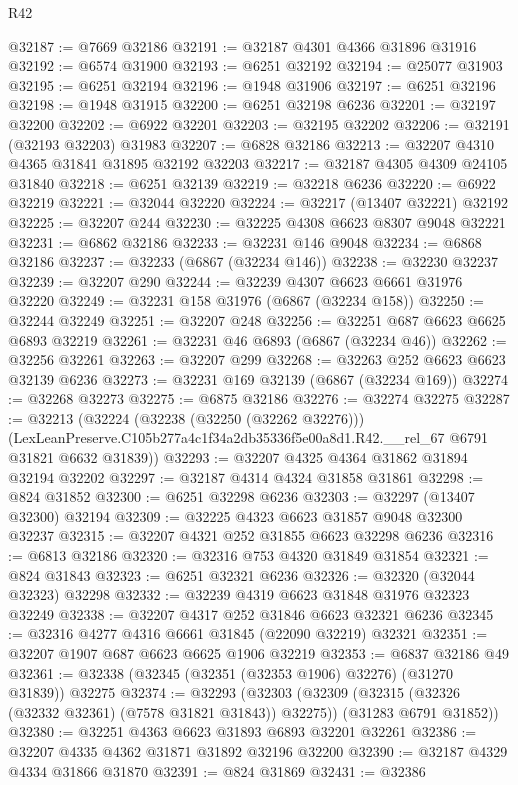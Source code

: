 \begin{lexlean}{R42}
\begin{coremodule}
{@32187 := @7669 @32186
@32191 := @32187 @4301 @4366 @31896 @31916
@32192 := @6574 @31900
@32193 := @6251 @32192
@32194 := @25077 @31903
@32195 := @6251 @32194
@32196 := @1948 @31906
@32197 := @6251 @32196
@32198 := @1948 @31915
@32200 := @6251 @32198 @6236
@32201 := @32197 @32200
@32202 := @6922 @32201
@32203 := @32195 @32202
@32206 := @32191 (@32193 @32203) @31983
@32207 := @6828 @32186
@32213 := @32207 @4310 @4365 @31841 @31895 @32192 @32203
@32217 := @32187 @4305 @4309 @24105 @31840
@32218 := @6251 @32139
@32219 := @32218 @6236
@32220 := @6922 @32219
@32221 := @32044 @32220
@32224 := @32217 (@13407 @32221) @32192
@32225 := @32207 @244
@32230 := @32225 @4308 @6623 @8307 @9048 @32221
@32231 := @6862 @32186
@32233 := @32231 @146 @9048
@32234 := @6868 @32186
@32237 := @32233 (@6867 (@32234 @146))
@32238 := @32230 @32237
@32239 := @32207 @290
@32244 := @32239 @4307 @6623 @6661 @31976 @32220
@32249 := @32231 @158 @31976 (@6867 (@32234 @158))
@32250 := @32244 @32249
@32251 := @32207 @248
@32256 := @32251 @687 @6623 @6625 @6893 @32219
@32261 := @32231 @46 @6893 (@6867 (@32234 @46))
@32262 := @32256 @32261
@32263 := @32207 @299
@32268 := @32263 @252 @6623 @6623 @32139 @6236
@32273 := @32231 @169 @32139 (@6867 (@32234 @169))
@32274 := @32268 @32273
@32275 := @6875 @32186
@32276 := @32274 @32275
@32287 := @32213
    (@32224
      (@32238 (@32250 (@32262 @32276)))
      (LexLeanPreserve.C105b277a4c1f34a2db35336f5e00a8d1.R42.__rel_67 @6791 @31821 @6632 @31839))
@32293 := @32207 @4325 @4364 @31862 @31894 @32194 @32202
@32297 := @32187 @4314 @4324 @31858 @31861
@32298 := @824 @31852
@32300 := @6251 @32298 @6236
@32303 := @32297 (@13407 @32300) @32194
@32309 := @32225 @4323 @6623 @31857 @9048 @32300 @32237
@32315 := @32207 @4321 @252 @31855 @6623 @32298 @6236
@32316 := @6813 @32186
@32320 := @32316 @753 @4320 @31849 @31854
@32321 := @824 @31843
@32323 := @6251 @32321 @6236
@32326 := @32320 (@32044 @32323) @32298
@32332 := @32239 @4319 @6623 @31848 @31976 @32323 @32249
@32338 := @32207 @4317 @252 @31846 @6623 @32321 @6236
@32345 := @32316 @4277 @4316 @6661 @31845 (@22090 @32219) @32321
@32351 := @32207 @1907 @687 @6623 @6625 @1906 @32219
@32353 := @6837 @32186 @49
@32361 := @32338 (@32345 (@32351 (@32353 @1906) @32276) (@31270 @31839)) @32275
@32374 := @32293
    (@32303
      (@32309 (@32315 (@32326 (@32332 @32361) (@7578 @31821 @31843)) @32275))
      (@31283 @6791 @31852))
@32380 := @32251 @4363 @6623 @31893 @6893 @32201 @32261
@32386 := @32207 @4335 @4362 @31871 @31892 @32196 @32200
@32390 := @32187 @4329 @4334 @31866 @31870
@32391 := @824 @31869
@32431 := @32386
}
\end{coremodule}
\end{lexlean}
